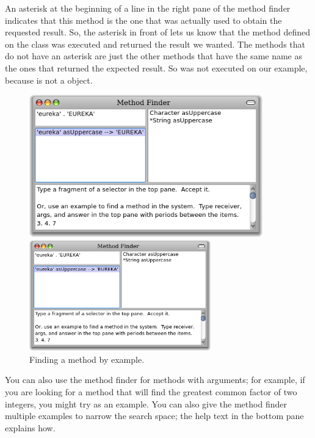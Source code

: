 \documentclass[a4paper,10pt,twoside]{book}
\begin{document}
An asterisk at the beginning of a line in the right pane of the method finder indicates that this method is the one that was actually used to obtain the requested result. 
So, the asterisk in front of  lets us know that the method  defined on the class  was executed and returned the result we wanted. The methods that do not have an asterisk are just the other methods that have the same name as the ones that returned the expected result. So  was not executed on our example, because  is not a  object.

\begin{figure}[hbt]
\ifluluelse
	{\centerline {\includegraphics[width=0.9\textwidth]{MethodFinder-example1}}}
	{\centerline {\includegraphics[width=0.7\textwidth]{MethodFinder-example1}}}
\caption{Finding a method by example.
\label{fig:methodFinder-example1}}
\end{figure}

You can also use the method finder for methods with arguments; for example, if you are looking for a method that will find the greatest common factor of two integers, you might try  as an example.  You can also give the method finder multiple examples to narrow the search space; the help text in the bottom pane explains how.
\end{document}
